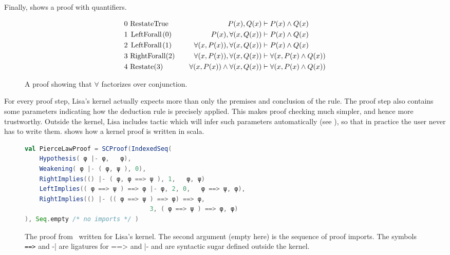 \noindent
Finally,  shows a proof with quantifiers.
%
\begin{figure}[ht]
  \begin{align*}
    0 & ~\text{\lstinline|RestateTrue|}    & \quad  P(x), Q(x)                              & \vdash P(x) \land Q(x)             \\
    1 & ~\text{\lstinline|LeftForall|}(0)  & \quad  P(x), \forall(x, Q(x))                  & \vdash P(x) \land Q(x)             \\
    2 & ~\text{\lstinline|LeftForall|}(1)  & \quad  \forall(x, P(x)), \forall(x, Q(x))      & \vdash P(x) \land Q(x)             \\
    3 & ~\text{\lstinline|RightForall|}(2) & \quad  \forall(x, P(x)),  \forall(x, Q(x))     & \vdash \forall(x, P(x) \land Q(x)) \\
    4 & ~\text{\lstinline|Restate|}(3)     & \quad  \forall(x, P(x)) \land \forall(x, Q(x)) & \vdash \forall(x, P(x) \land Q(x))
  \end{align*}
  \caption{A proof showing that $\forall$ factorizes over conjunction.}
  \label{fig:exampleProofQuantifiers}
\end{figure}

For every proof step, Lisa's kernel actually expects more than only the premises and conclusion of the rule. The proof step also contains some parameters indicating how the deduction rule is precisely applied. This makes proof checking much simpler, and hence more trustworthy. Outside the kernel, Lisa includes tactic which will infer such parameters automatically (see ), so that in practice the user never has to write them.
 shows how a kernel proof is written in scala.

\begin{figure}[ht]
  \centering
  \begin{lstlisting}[language=scala, showspaces=false]
val PierceLawProof = SCProof(IndexedSeq(
    Hypothesis( φ |- φ,   φ),
    Weakening( φ |- ( φ, ψ ), 0),
    RightImplies(() |- ( φ, φ ==> ψ ), 1,   φ, ψ)
    LeftImplies(( φ ==> ψ ) ==> φ |- φ, 2, 0,   φ ==> ψ, φ),
    RightImplies(() |- (( φ ==> ψ ) ==> φ) ==> φ,
                                  3, ( φ ==> ψ ) ==> φ, φ)
), Seq.empty /* no imports */ )
    \end{lstlisting}
  \caption{The proof from~ written for Lisa's kernel. The second argument (empty here) is the sequence of proof imports. The symbols \lstinline|==>| and \lstinline||-| are ligatures for ==> and |- and are syntactic sugar defined outside the kernel.}
  \label{fig:ExampleProofPierceScala}
\end{figure}

